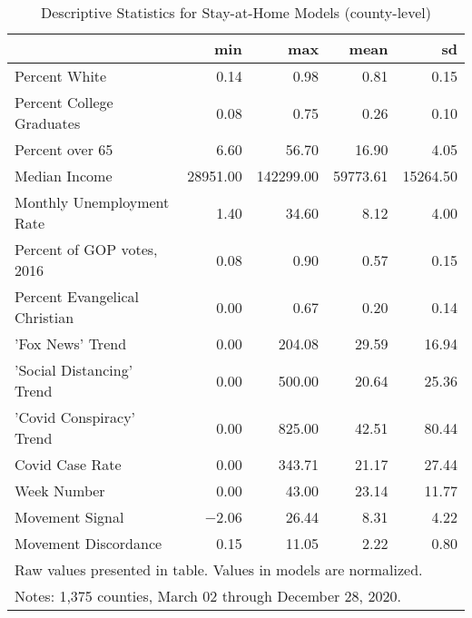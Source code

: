 \begin{table}[!h]

\caption{\label{tab:google-desc-table}Descriptive Statistics for Stay-at-Home Models (county-level)}
\centering
\begin{tabular}[t]{lrrrr}
\toprule
  & min & max & mean & sd\\
\midrule
Percent White & \num{0.14} & \num{0.98} & \num{0.81} & \num{0.15}\\
Percent College Graduates & \num{0.08} & \num{0.75} & \num{0.26} & \num{0.10}\\
Percent over 65 & \num{6.60} & \num{56.70} & \num{16.90} & \num{4.05}\\
Median Income & \num{28951.00} & \num{142299.00} & \num{59773.61} & \num{15264.50}\\
Monthly Unemployment Rate & \num{1.40} & \num{34.60} & \num{8.12} & \num{4.00}\\
Percent of GOP votes, 2016 & \num{0.08} & \num{0.90} & \num{0.57} & \num{0.15}\\
Percent Evangelical Christian & \num{0.00} & \num{0.67} & \num{0.20} & \num{0.14}\\
'Fox News' Trend & \num{0.00} & \num{204.08} & \num{29.59} & \num{16.94}\\
'Social Distancing' Trend & \num{0.00} & \num{500.00} & \num{20.64} & \num{25.36}\\
'Covid Conspiracy' Trend & \num{0.00} & \num{825.00} & \num{42.51} & \num{80.44}\\
Covid Case Rate & \num{0.00} & \num{343.71} & \num{21.17} & \num{27.44}\\
Week Number & \num{0.00} & \num{43.00} & \num{23.14} & \num{11.77}\\
Movement Signal & \num{-2.06} & \num{26.44} & \num{8.31} & \num{4.22}\\
Movement Discordance & \num{0.15} & \num{11.05} & \num{2.22} & \num{0.80}\\
\bottomrule
\multicolumn{5}{l}{\rule{0pt}{1em}Raw values presented in table. Values in models are normalized.}\\
\multicolumn{5}{l}{\rule{0pt}{1em}Notes: 1,375 counties, March 02 through December 28, 2020.}\\
\end{tabular}
\end{table}